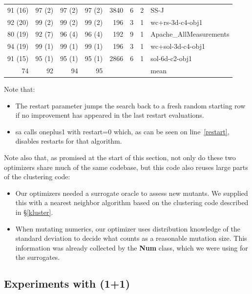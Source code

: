\documentclass[AMA,STIX2COL]{WileyNJDv5}
\newcommand{\NEW}[1]{\textcolor{newblue}{#1}}
\newcommand{\cls}[1]{%
  \setlength{\fboxsep}{1.5pt}%
  \colorbox{clsbg}{\sffamily\bfseries{#1}}%
}
\begin{document}
\begin{table}[t]
\begin{tabular}{rrrrrrrl}
 91 (16) & 97 (2) & 97 (2) & 97 (2) & 3840 & 6 & 2 & SS-J \\
 92 (20) & 99 (2) & 99 (2) & 99 (2) & 196 & 3 & 1 & wc+rs-3d-c4-obj1 \\
 80 (19) & 92 (7) & 96 (4) & 96 (4) & 192 & 9 & 1 & Apache\_AllMeasurements \\
 94 (19) & 99 (1) & 99 (1) & 99 (1) & 196 & 3 & 1 & wc+sol-3d-c4-obj1 \\
 91 (15) & 95 (1) & 95 (1) & 95 (1) & 2866 & 6 & 1 & sol-6d-c2-obj1 \\
\midrule
 74 & 92 & 94 & 95 & & & & mean \\
\end{tabular}
\end{table} 
Note that:
\begin{itemize}
\item The \textsf{restart} parameter jumps the search back to a
fresh random starting row if no improvement has appeared in the
last \textsf{restart} evaluations.  
\item \textsf{sa} calls \textsf{oneplus1} with \textsf{restart=0}
which, as can be seen on line~\ref{restart}, disables restarts for
that algorithm.
\end{itemize}
Note also that, as promised at the start of this section, not only
do these two optimizers share much of the same codebase, but this
code also reuses large parts of the clustering code:
\begin{itemize}
\item Our optimizers needed a surrogate oracle to assess new
mutants. We supplied this with a nearest neighbor algorithm based
on the clustering code  described in \S\ref{kluster}.
\item When mutating numerics, our optimizer uses distribution
knowledge of the standard deviation to decide what counts as a
reasonable mutation size. This information was already collected
by the \cls{Num} class, which we were using for the surrogates.
\end{itemize}


\subsection{Experiments with (1+1)}\label{sec:opt-results}
\end{document}
